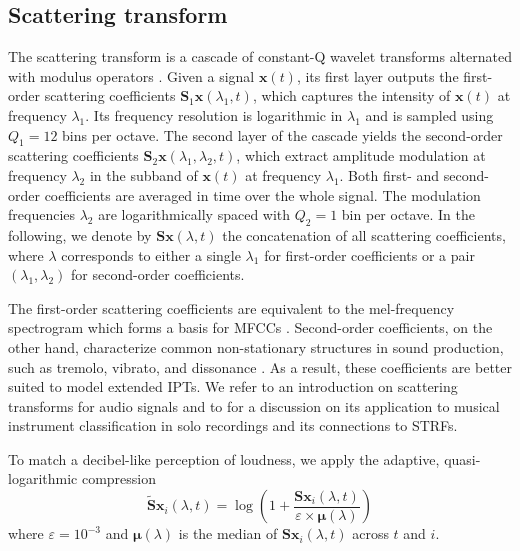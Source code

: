 \subsection{Scattering transform} %
The scattering transform is a cascade of constant-Q wavelet transforms alternated with modulus operators \cite{mallat2012cpam,anden2014taslp}.
Given a signal $\boldsymbol{x} (t)$, its first layer outputs the first-order scattering coefficients $\mathbf{S}_1 \boldsymbol{x} (\lambda_1, t)$, which captures the intensity of $\boldsymbol{x} (t)$ at frequency $\lambda_1$.
Its frequency resolution is logarithmic in $\lambda_1$ and is sampled using $Q_1 = 12$ bins per octave.
The second layer of the cascade yields the second-order scattering coefficients $\mathbf{S}_2 \boldsymbol{x} (\lambda_1, \lambda_2, t)$, which extract amplitude modulation at frequency $\lambda_2$ in the subband of $\boldsymbol{x} (t)$ at frequency $\lambda_1$.
Both first- and second-order coefficients are averaged in time over the whole signal.
The modulation frequencies $\lambda_2$ are logarithmically spaced with $Q_2 = 1$ bin per octave.
In the following, we denote by $\mathbf{S}\boldsymbol{x}(\lambda, t)$ the concatenation of all scattering coefficients, where $\lambda$ corresponds to either a single $\lambda_1$ for first-order coefficients or a pair $(\lambda_1,\lambda_2)$ for second-order coefficients.

The first-order scattering coefficients are equivalent to the mel-frequency spectrogram which forms a basis for MFCCs \cite{anden2014taslp}.
Second-order coefficients, on the other hand, characterize common non-stationary structures in sound production, such as tremolo, vibrato, and dissonance \cite[section 4]{anden2012dafx}.
As a result, these coefficients are better suited to model extended IPTs.
We refer to \cite{anden2014taslp} an introduction on scattering transforms for audio signals and to \cite[sections 3.2 and 4.5]{lostanlen2017phd} for a discussion on its application to musical instrument classification in solo recordings and its connections to STRFs.

To match a decibel-like perception of loudness, we apply the adaptive, quasi-logarithmic compression
\begin{equation}
\widetilde{\mathbf{S}} \boldsymbol{x}_i(\lambda, t) =
\log \left(
1 + \dfrac{\mathbf{S}\boldsymbol{x}_i(\lambda, t)}{\varepsilon \times \boldsymbol{\mu}(\lambda)}
\right)
\label{eq:log-scattering}
\end{equation}
where $\varepsilon = 10^{-3}$ and $\boldsymbol{\mu}(\lambda)$ is the median of $\mathbf{S}\boldsymbol{x}_i (\lambda, t)$ across $t$ and $i$.

